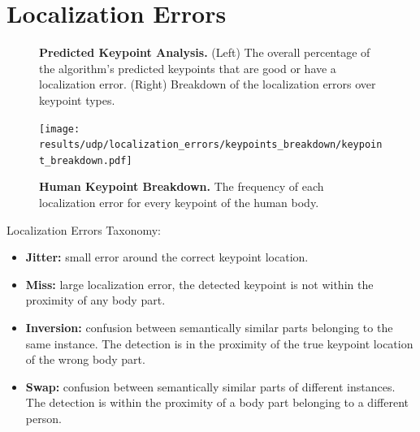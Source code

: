 \documentclass[10pt,onecolumn,letterpaper]{article}
\begin{document}
\clearpage

\section{Localization Errors}

\begin{figure}[h!]
\centering
{}
\caption{ {\small \textbf{Predicted Keypoint Analysis.}
(Left) The overall percentage of the algorithm's predicted keypoints that are good or have a localization error.
(Right) Breakdown of the localization errors over keypoint types.}}
\end{figure}

\begin{figure}
\texttt{[image: results/udp/localization\_errors/keypoints\_breakdown/keypoint\_breakdown.pdf]}
\caption{ {\small \textbf{Human Keypoint Breakdown.} The frequency of each localization error for every keypoint of the human body.}}
\end{figure}

Localization Errors Taxonomy:
\begin{itemize}
\item \textbf{Jitter:} small error around the correct keypoint location.

\item \textbf{Miss:} large localization error, the detected keypoint is not within the proximity of any body part.

\item \textbf{Inversion:} confusion between semantically similar parts belonging to the same instance. The detection is in the proximity of the true keypoint location of the wrong body part.

\item \textbf{Swap:} confusion between semantically similar parts of different instances. The detection is within the proximity of a body part belonging to a different person.

\end{itemize}
\end{document}
